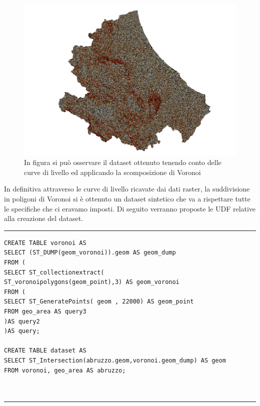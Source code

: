 \begin{figure}[h]
	\centering
	\includegraphics[width=1\textwidth]{images/voronoi.png}
	\caption{In figura si può osservare il dataset ottenuto tenendo conto delle curve di livello ed applicando la scomposizione di Voronoi}
	\label{fig:diagrammaER}
\end{figure}
In definitiva attraverso le curve di livello ricavate dai dati raster, la suddivisione in poligoni di Voronoi si è ottenuto un dataset sintetico che va a rispettare tutte le specifiche che ci eravamo imposti. Di seguito verranno proposte le UDF relative alla creazione del dataset.
\newpage
\hrule
\begin{lstlisting}
CREATE TABLE voronoi AS
SELECT (ST_DUMP(geom_voronoi)).geom AS geom_dump 
FROM (
SELECT ST_collectionextract(
ST_voronoipolygons(geom_point),3) AS geom_voronoi
FROM (
SELECT ST_GeneratePoints( geom , 22000) AS geom_point
FROM geo_area AS query3 
)AS query2
)AS query;

CREATE TABLE dataset AS
SELECT ST_Intersection(abruzzo.geom,voronoi.geom_dump) AS geom
FROM voronoi, geo_area AS abruzzo;



\end{lstlisting}
\hrule
